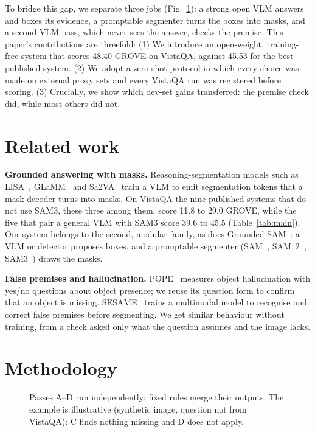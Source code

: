 \documentclass{article}
\begin{document}
To bridge this gap, we separate three jobs (Fig.~\ref{fig:pipe}): a strong open VLM answers and boxes its evidence, a
promptable segmenter turns the boxes into masks, and a second VLM pass, which never sees the answer, checks the premise.
This paper's contributions are threefold: (1) We introduce an open-weight, training-free system that scores 48.40 GROVE on
VistaQA, against 45.53 for the best published system. (2) We adopt a zero-shot protocol in which every choice was made on
external proxy sets and every VistaQA run was registered before scoring. (3) Crucially, we show which dev-set gains
transferred: the premise check did, while most others did not.

\section{Related work}
\textbf{Grounded answering with masks.} Reasoning-segmentation models such as LISA~\cite{lisa}, GLaMM~\cite{glamm} and
Sa2VA~\cite{sa2va} train a VLM to emit segmentation tokens that a mask decoder turns into masks. On VistaQA the nine published
systems that do not use SAM3, these three among them, score 11.8 to 29.0 GROVE, while the five that pair a general VLM with SAM3 score 39.6 to 45.5
(Table~\ref{tab:main}). Our system belongs to the second, modular family, as does Grounded-SAM~\cite{groundedsam}: a VLM or
detector proposes boxes, and a promptable segmenter (SAM~\cite{sam}, SAM~2~\cite{sam2}, SAM3~\cite{sam3}) draws the masks.

\textbf{False premises and hallucination.} POPE~\cite{pope} measures object hallucination with yes/no questions about object
presence; we reuse its question form to confirm that an object is missing. SESAME~\cite{sesame} trains a multimodal model to
recognise and correct false premises before segmenting. We get similar behaviour without training, from a check asked only
what the question assumes and the image lacks.

\section{Methodology}\label{sec:system}
\begin{figure}[t]
\centering

\caption{Passes A--D run independently; fixed rules merge their outputs. The example is illustrative (synthetic image,
question not from VistaQA): C finds nothing missing and D does not apply.}
\label{fig:pipe}
\end{figure}
\end{document}
